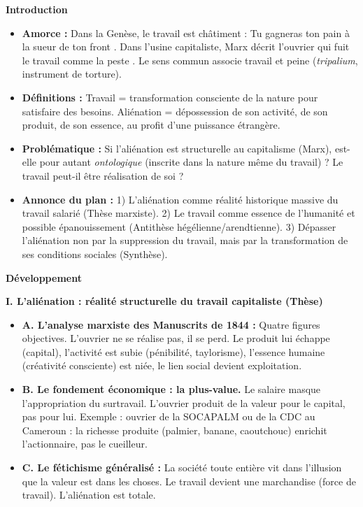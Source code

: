 \documentclass[11pt]{article}
\begin{document}
\begin{exoresolu}
\textbf{Introduction}
\begin{itemize}
    \item \textbf{Amorce :} Dans la Genèse, le travail est châtiment : \guillemotleft Tu gagneras ton pain à la sueur de ton front \guillemotright. Dans l'usine capitaliste, Marx décrit l'ouvrier qui \guillemotleft fuit le travail comme la peste \guillemotright. Le sens commun associe travail et peine (\emph{tripalium}, instrument de torture).
    \item \textbf{Définitions :} Travail = transformation consciente de la nature pour satisfaire des besoins. Aliénation = dépossession de son activité, de son produit, de son essence, au profit d'une puissance étrangère.
    \item \textbf{Problématique :} Si l'aliénation est structurelle au capitalisme (Marx), est-elle pour autant \emph{ontologique} (inscrite dans la nature même du travail) ? Le travail peut-il être réalisation de soi ?
    \item \textbf{Annonce du plan :} 1) L'aliénation comme réalité historique massive du travail salarié (Thèse marxiste). 2) Le travail comme essence de l'humanité et possible épanouissement (Antithèse hégélienne/arendtienne). 3) Dépasser l'aliénation non par la suppression du travail, mais par la transformation de ses conditions sociales (Synthèse).
\end{itemize}

\textbf{Développement}

\textbf{I. L'aliénation : réalité structurelle du travail capitaliste (Thèse)}
\begin{itemize}
    \item \textbf{A. L'analyse marxiste des Manuscrits de 1844 :} Quatre figures objectives. L'ouvrier ne se réalise pas, il se perd. Le produit lui échappe (capital), l'activité est subie (pénibilité, taylorisme), l'essence humaine (créativité consciente) est niée, le lien social devient exploitation.
    \item \textbf{B. Le fondement économique : la plus-value.} Le salaire masque l'appropriation du surtravail. L'ouvrier produit de la valeur pour le capital, pas pour lui. Exemple : ouvrier de la SOCAPALM ou de la CDC au Cameroun : la richesse produite (palmier, banane, caoutchouc) enrichit l'actionnaire, pas le cueilleur.
    \item \textbf{C. Le fétichisme généralisé :} La société toute entière vit dans l'illusion que la valeur est dans les choses. Le travail devient une marchandise (force de travail). L'aliénation est totale.
\end{itemize}


\end{exoresolu}
\end{document}
